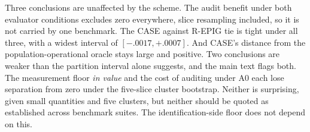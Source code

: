\documentclass{article}
\theoremstyle{plain}
\theoremstyle{remark}
\begin{document}
Three conclusions are unaffected by the scheme. The audit benefit under both evaluator conditions
excludes zero everywhere, slice resampling included, so it is not carried by one benchmark. The CASE
against R-EPIG tie is tight under all three, with a widest interval of $[-.0017,+.0007]$. And CASE's
distance from the population-operational oracle stays large and positive. Two conclusions are weaker
than the partition interval alone suggests, and the main text flags both. The measurement floor
\emph{in value} and the cost of auditing under A0 each lose separation from zero under the five-slice
cluster bootstrap. Neither is surprising, given small quantities and five clusters, but neither should
be quoted as established across benchmark suites. The identification-side floor does not depend on
this.
\end{document}
